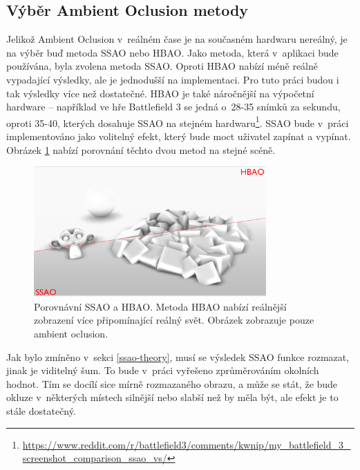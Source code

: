 \subsection*{Výběr Ambient Oclusion metody}
Jelikož Ambient Oclusion v~reálném čase je na současném hardwaru nereálný, je na výběr buď metoda SSAO nebo HBAO. Jako metoda, která v~aplikaci bude používána, byla zvolena metoda SSAO. Oproti HBAO nabízí méně reálně vypadající výsledky, ale je jednodušší na implementaci. Pro tuto práci budou i tak výsledky  více než dostatečné. HBAO je také náročnější na výpočetní hardware -- například ve hře Battlefield 3 se jedná o~28-35 snímků za sekundu, oproti 35-40, kterých dosahuje SSAO na stejném hardwaru\footnote{\href{https://www.reddit.com/r/battlefield3/comments/kwnip/my_battlefield_3_screenshot_comparison_ssao_vs/}{https://www.reddit.com/r/battlefield3/comments/kwnip/my\_battlefield\_3\_screenshot\_comparison\_ssao\_vs/}}. SSAO bude v~práci implementováno jako volitelný efekt, který bude moct uživatel zapínat a vypínat. Obrázek \ref{ssao-hbao-comp} nabízí porovnání těchto dvou metod na stejné scéně.

\begin{figure}[H]
	\centering
	\includegraphics[width=24em]{images/navrh/ssao-hbao.png}
	\caption[caption]{Porovnávní SSAO a HBAO. Metoda HBAO nabízí reálnější zobrazení více připomínající reálný svět. Obrázek zobrazuje pouze ambient oclusion.\footnotemark} 
	\label{ssao-hbao-comp}
\end{figure}


Jak bylo zmíněno v~sekci \ref{ssao-theory}, musí se výsledek SSAO funkce rozmazat, jinak je viditelný šum. To bude v~práci vyřešeno zprůměrováním okolních hodnot. Tím se docílí sice mírně rozmazaného obrazu, a může se stát, že bude okluze v~některých místech silnější nebo slabší než by měla být, ale efekt je to stále dostatečný.


